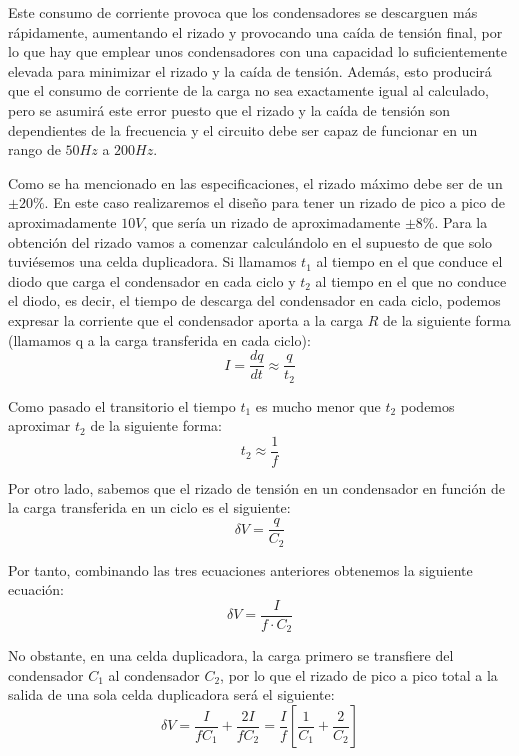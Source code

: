 Este consumo de corriente provoca que los condensadores se descarguen más rápidamente, aumentando 
el rizado y provocando una caída de tensión final, por lo que hay que emplear unos condensadores con 
una capacidad lo suficientemente elevada para minimizar el rizado y la caída de tensión. Además, esto producirá que el consumo de corriente
de la carga no sea exactamente igual al calculado, pero se asumirá este error puesto que el rizado y la caída de tensión son dependientes de la frecuencia
y el circuito debe ser capaz de funcionar en un rango de $50Hz$ a $200Hz$.

Como se ha mencionado en las especificaciones, el rizado máximo debe ser de un $\pm20\%$. En este caso 
realizaremos el diseño para tener un rizado de pico a pico de aproximadamente $10V$, que sería un 
rizado de aproximadamente $\pm8\%$. Para la obtención del rizado vamos a comenzar calculándolo 
en el supuesto de que solo tuviésemos una celda duplicadora. Si llamamos $t_1$ al tiempo en el que conduce el diodo que carga 
el condensador en cada ciclo y $t_2$ al tiempo en el que no conduce el diodo, es decir, el tiempo de descarga 
del condensador en cada ciclo, podemos expresar la corriente que el condensador aporta a la carga $R$ de la siguiente forma (llamamos 
q a la carga transferida en cada ciclo):
\begin{equation}
    I = \frac{dq}{dt} \approx \frac{q}{t_2}
\end{equation}

Como pasado el transitorio el tiempo $t_1$ es mucho menor que $t_2$ podemos aproximar 
$t_2$ de la siguiente forma:
\begin{equation}
    t_2 \approx \frac{1}{f}
\end{equation}

Por otro lado, sabemos que el rizado de tensión en un condensador en función de la carga transferida 
en un ciclo es el siguiente:
\begin{equation}
    \delta V = \frac{q}{C_2}
\end{equation}

Por tanto, combinando las tres ecuaciones anteriores obtenemos la siguiente ecuación:
\begin{equation}
    \delta V = \frac{I}{f\cdot C_2}
\end{equation}

No obstante, en una celda duplicadora, la carga primero se transfiere del condensador $C_1$ al condensador 
$C_2$, por lo que el rizado de pico a pico total a la salida de una sola celda duplicadora será el siguiente:
\begin{equation}
    \delta V = \frac{I}{fC_1}+\frac{2I}{fC_2} = \frac{I}{f}\left[\frac{1}{C_1}+\frac{2}{C_2}\right]
\end{equation}

